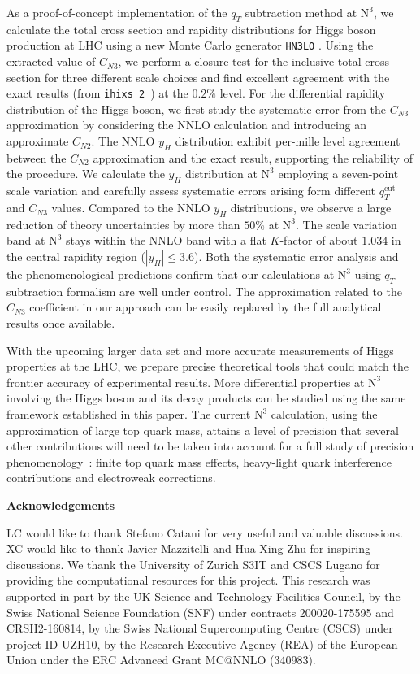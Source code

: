 \documentclass[12pt]{article}
\DeclareRobustCommand{\qt}{\ensuremath{q_T}\xspace}
\DeclareRobustCommand{\qtcut}{\ensuremath{q_T^\mathrm{cut}}\xspace}
\DeclareRobustCommand{\LO}{\text{LO}\xspace}
\DeclareRobustCommand{\N}[1]{\ensuremath{\text{N}^{#1}}} %
\begin{document}
As a proof-of-concept implementation of the $\qt$ subtraction method at \N3\LO,  we calculate the total cross section and rapidity distributions for Higgs boson production at LHC using a new Monte Carlo generator \texttt{HN3LO} \cite{leaninprepHN3LO}. Using the extracted value of $C_{N3}$, we perform a closure test for the inclusive total cross section for three different scale choices and find excellent agreement with the exact results (from \texttt{ihixs 2}~\cite{Dulat:2018rbf}) at the $0.2\%$ level. For the differential rapidity distribution of the Higgs boson, we first study the systematic error from the $C_{N3}$ approximation by considering the NNLO calculation and introducing an approximate $C_{N2}$. The NNLO $y_H$ distribution exhibit per-mille level agreement between the $C_{N2}$ approximation and the exact result, supporting the reliability of the procedure. 
We calculate the $y_H$ distribution at \N3\LO employing a seven-point scale variation and carefully assess systematic errors arising form different $\qtcut$ and $C_{N3}$ values. Compared to the NNLO $y_H$ distributions, we observe a large reduction of theory uncertainties by more than $50\%$ at \N3\LO. The scale variation band at \N3\LO stays within the NNLO band with a flat $K$-factor of about $1.034$ in the central rapidity region ($|y_H|\leq3.6$). Both the systematic error analysis and the phenomenological predictions confirm that our calculations at \N3\LO using $\qt$ subtraction formalism are well under control. The approximation related to the $C_{N3}$ coefficient in our approach can be easily replaced by the full analytical results once available. 

With the upcoming larger data set and more accurate measurements of Higgs properties at the LHC, we prepare precise theoretical tools that could match the frontier accuracy of experimental results. More differential properties at \N3\LO involving the Higgs boson and its decay products can be studied using the same framework established in this paper. The current \N3\LO calculation, using the approximation of large top quark mass, attains a level of  precision that several 
other contributions will need to be taken into account for a full study of precision phenomenology~\cite{Anastasiou:2016cez}: finite top quark mass effects, heavy-light quark interference contributions  
and electroweak corrections. 


\bigskip\noindent\textbf{Acknowledgements}

LC would like to thank Stefano Catani for very useful and valuable discussions. XC would like to thank Javier Mazzitelli and Hua Xing Zhu for inspiring discussions. We thank the University of Zurich S3IT and CSCS Lugano for providing the computational resources for this project. This research was supported in part by the UK Science and Technology Facilities Council, by the Swiss National Science Foundation (SNF) under contracts 200020-175595 and CRSII2-160814, by the Swiss National Supercomputing Centre (CSCS) under project ID UZH10, by the Research Executive Agency (REA) of the European Union under the ERC Advanced Grant MC@NNLO (340983).
\end{document}
